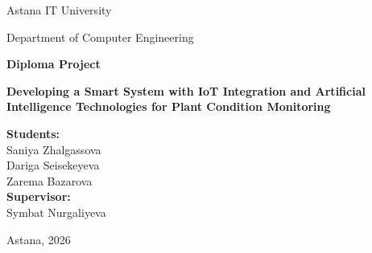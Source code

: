 \documentclass[12pt,a4paper]{report}
\begin{document}
\begin{titlepage}
    \centering

    {\large Astana IT University\par}
    \vspace{0.4cm}
    {\large Department of Computer Engineering\par}

    \vfill

    {\Large \textbf{Diploma Project}\par}
    \vspace{1cm}

    {\LARGE \textbf{Developing a Smart System with IoT Integration and Artificial Intelligence Technologies for Plant Condition Monitoring}\par}

    \vfill

    \begin{flushright}
        \textbf{Students:}\\
        Saniya Zhalgassova\\
        Dariga Seisekeyeva\\
        Zarema Bazarova\\[0.6cm]

        \textbf{Supervisor:}\\
        Symbat Nurgaliyeva
    \end{flushright}

    \vfill

    {\large Astana, 2026}

\end{titlepage}


\begingroup
{}
\small

\endgroup

\tableofcontents
\listoffigures
\listoftables

\clearpage







\clearpage
{}



\appendix

\end{document}
